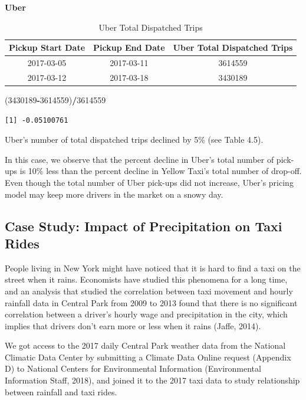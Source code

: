 \documentclass[12pt,twoside]{reedthesis}
\newenvironment{Shaded}{\begin{snugshade}}{\end{snugshade}}
\newcommand{\DecValTok}[1]{\textcolor[rgb]{0.00,0.00,0.81}{#1}}
\newcommand{\OperatorTok}[1]{\textcolor[rgb]{0.81,0.36,0.00}{\textbf{#1}}}
\newcommand{\NormalTok}[1]{#1}
\theoremstyle{definition}
\theoremstyle{definition}
\theoremstyle{definition}
\theoremstyle{remark}
\begin{document}
\textbf{Uber}
\begin{table}

\caption{\label{tab:unnamed-chunk-73}Uber Total Dispatched Trips}
\centering
\begin{tabular}[t]{ccc}
\toprule
Pickup Start Date & Pickup End Date & Uber Total Dispatched Trips\\
\midrule
2017-03-05 & 2017-03-11 & 3614559\\
2017-03-12 & 2017-03-18 & 3430189\\
\bottomrule
\end{tabular}
\end{table}
\begin{Shaded}
\begin{Highlighting}[]
\NormalTok{(}\DecValTok{3430189}\OperatorTok{-}\DecValTok{3614559}\NormalTok{)}\OperatorTok{/}\DecValTok{3614559}
\end{Highlighting}
\end{Shaded}
\begin{verbatim}
[1] -0.05100761
\end{verbatim}
Uber's number of total dispatched trips declined by 5\% (see Table 4.5).

In this case, we observe that the percent decline in Uber's total number
of pick-ups is 10\% less than the percent decline in Yellow Taxi's total
number of drop-off. Even though the total number of Uber pick-ups did
not increase, Uber's pricing model may keep more drivers in the market
on a snowy day.

\subsection{Case Study: Impact of Precipitation on Taxi
Rides}\label{case-study-impact-of-precipitation-on-taxi-rides}

People living in New York might have noticed that it is hard to find a
taxi on the street when it rains. Economists have studied this phenomena
for a long time, and an analysis that studied the correlation between
taxi movement and hourly rainfall data in Central Park from 2009 to 2013
found that there is no significant correlation between a driver's hourly
wage and precipitation in the city, which implies that drivers don't
earn more or less when it rains (Jaffe, 2014).

We got access to the 2017 daily Central Park weather data from the
National Climatic Data Center by submitting a Climate Data Online
request (Appendix D) to National Centers for Environmental Information
(Environmental Information Staff, 2018), and joined it to the 2017 taxi
data to study relationship between rainfall and taxi rides.
\end{document}
